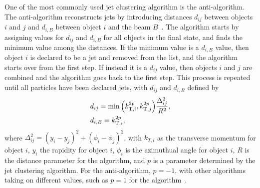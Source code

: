 One of the most commonly used jet clustering algorithm is the anti-\kt algorithm.
The anti-\kt algorithm reconstructs jets by introducing distances $d_{ij}$ between objects $i$ and $j$ and $d_{i,B}$ between object $i$ and the beam $B$~\cite{Cacciari_2008}.
The algorithm starts by assigning values for $d_{ij}$ and $d_{i,B}$ for all objects in the final state, and finds the minimum value among the distances.
If the minimum value is a $d_{i,B}$ value, then object $i$ is declared to be a jet and removed from the list, and the algorithm starts over from the first step.
If instead it is a $d_{ij}$ value, then objects $i$ and $j$ are combined and the algorithm goes back to the first step.
This process is repeated until all particles have been declared jets, with $d_{ij}$ and $d_{i,B}$ defined by
\begin{align}
  & d_{ij}=\min\pqty{k_{\mathrm{T},i}^{2p},k_{\mathrm{T},j}^{2p}}\frac{\Delta_{ij}^2}{R^2},\\
  & d_{i,B}=k_{\mathrm{T},i}^{2p},
\end{align}
where $\Delta_{ij}^2=(y_i-y_j)^2+(\phi_i-\phi_j)^2$, with $k_{T,i}$ as the transverse momentum for object $i$, $y_i$ the rapidity for object $i$, $\phi_i$ is the azimuthual angle for object $i$, $R$ is the distance parameter for the algorithm, and $p$ is a parameter determined by the jet clustering algorithm.
For the anti-\kt algorithm, $p=-1$, with other algorithms taking on different values, such as $p=1$ for the \kt algorithm~\cite{Marzani_2019}.
